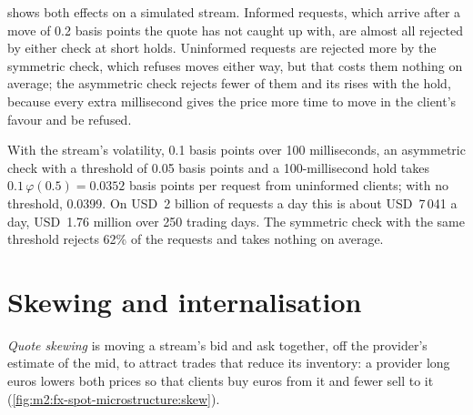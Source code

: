 \begin{omfigure}
\label{fig:m2:fx-spot-microstructure:hold}
\end{omfigure}

 shows both effects on a simulated
stream. Informed requests, which arrive after a move of 0.2 basis points the
quote has not caught up with, are almost all rejected by either check at short
holds. Uninformed requests are rejected more by the symmetric check, which
refuses moves either way, but that costs them nothing on average; the asymmetric
check rejects fewer of them and its  rises with the hold, because every
extra millisecond gives the price more time to move in the client's favour and
be refused.

\begin{example}\label{ex:m2:fx-spot-microstructure:window}
With the stream's volatility, 0.1 basis points over 100 milliseconds, an
asymmetric check with a threshold of 0.05 basis points and a 100-millisecond
hold takes $0.1\,\varphi(0.5) = 0.0352$ basis points per request from uninformed
clients; with no threshold, 0.0399. On USD~2 billion of requests a day this is
about USD~7\,041 a day, USD~1.76 million over 250 trading days. The symmetric
check with the same threshold rejects 62\% of the requests and takes nothing on
average.
\end{example}

\section{Skewing and internalisation}

\begin{definition}\label{def:m2:fx-spot-microstructure:skew}
\emph{Quote skewing} is moving a stream's bid and ask
together, off the provider's estimate of the mid, to attract trades that reduce
its inventory: a provider long euros lowers both prices so that clients buy
euros from it and fewer sell to it (\cref{fig:m2:fx-spot-microstructure:skew}).
\end{definition}

